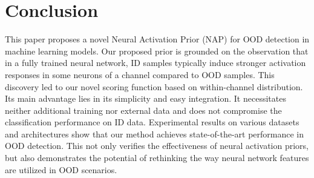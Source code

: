 \section{Conclusion}
This paper proposes a novel Neural Activation Prior (NAP) for OOD detection in machine learning models. Our proposed prior is grounded on the observation that in a fully trained neural network, ID samples typically induce stronger activation responses in some neurons of a channel compared to OOD samples. This discovery led to our novel scoring function based on within-channel distribution.
Its main advantage lies in its simplicity and easy integration. It necessitates neither additional training nor external data and does not compromise the classification performance on ID data. Experimental results on various datasets and architectures show that our method achieves state-of-the-art performance in OOD detection. This not only verifies the effectiveness of neural activation priors, but also demonstrates the potential of rethinking the way neural network features are utilized in OOD scenarios.